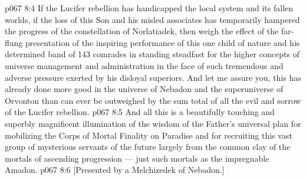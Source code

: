 \vs p067 8:4 If the Lucifer rebellion has handicapped the local system and its fallen worlds, if the loss of this Son and his misled associates has temporarily hampered the progress of the constellation of Norlatiadek, then weigh the effect of the far\hyp{}flung presentation of the inspiring performance of this one child of nature and his determined band of 143 comrades in standing steadfast for the higher concepts of universe management and administration in the face of such tremendous and adverse pressure exerted by his disloyal superiors. And let me assure you, this has already done more good in the universe of Nebadon and the superuniverse of Orvonton than can ever be outweighed by the sum total of all the evil and sorrow of the Lucifer rebellion.
\vs p067 8:5 And all this is a beautifully touching and superbly magnificent illumination of the wisdom of the Father’s universal plan for mobilizing the Corps of Mortal Finality on Paradise and for recruiting this vast group of mysterious servants of the future largely from the common clay of the mortals of ascending progression --- just such mortals as the impregnable Amadon.
\vsetoff
\vs p067 8:6 [Presented by a Melchizedek of Nebadon.]
\quizlink
{}
